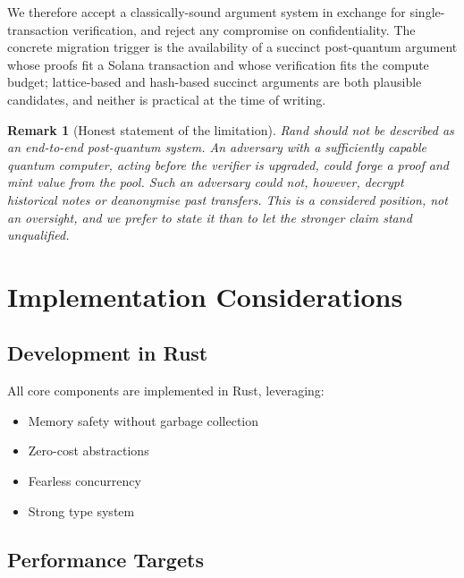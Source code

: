 \documentclass[11pt,a4paper]{article}
\newtheorem{remark}[theorem]{Remark}
\begin{document}
We therefore accept a classically-sound argument system in exchange for single-transaction verification, and reject any compromise on confidentiality. The concrete migration trigger is the availability of a succinct post-quantum argument whose proofs fit a Solana transaction and whose verification fits the compute budget; lattice-based and hash-based succinct arguments are both plausible candidates, and neither is practical at the time of writing.

\begin{remark}[Honest statement of the limitation]
Rand should not be described as an end-to-end post-quantum system. An adversary with a sufficiently capable quantum computer, acting before the verifier is upgraded, could forge a proof and mint value from the pool. Such an adversary could not, however, decrypt historical notes or deanonymise past transfers. This is a considered position, not an oversight, and we prefer to state it than to let the stronger claim stand unqualified.
\end{remark}

\section{Implementation Considerations}
\label{sec:implementation}

\subsection{Development in Rust}

All core components are implemented in Rust, leveraging:
\begin{itemize}
    \item Memory safety without garbage collection
    \item Zero-cost abstractions
    \item Fearless concurrency
    \item Strong type system
\end{itemize}

\subsection{Performance Targets}
\end{document}
